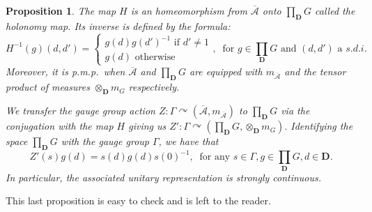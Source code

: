\documentclass[a4paper,12pt]{amsart}
\numberwithin{equation}{section}
\newtheorem{proposition}[theo]{Proposition}
\theoremstyle{definition}
\newcommand{\act}{\curvearrowright}
\newcommand{\oscrA}{{\overline{\mathscr{A}}}}
\newcommand{\D}{\mathbf D}
\newcommand{\Ga}{\Gamma}
\newcommand{\ot}{\otimes}\newcommand{\otmin}{\otimes_{\text{min}}}
\begin{document}
\begin{proposition}\label{prop:holonomy}
The map $H$ is an homeomorphism from $\oscrA$ onto $\prod_\D G$ called the holonomy map.
Its inverse is defined by the formula:
$$H^{-1}(g)(d,d') = \begin{cases} g(d) g(d')^{-1} \text{ if } d'\neq 1 \\ g(d) \text{ otherwise } \end{cases} , \ \text{ for } g\in\prod_\D G \text{ and } (d,d') \text{ a } s.d.i.$$
Moreover, it is p.m.p.~when $\oscrA$ and $\prod_\D G$ are equipped with $m_\oscrA$ and the tensor product of measures $\ot_\D m_G$ respectively.

We transfer the gauge group action $Z:\Ga\act (\oscrA,m_\oscrA)$ to $\prod_\D G$ via the conjugation with the map $H$ giving us $Z':\Ga\act (\prod_\D G, \ot_\D m_G).$
Identifying the space $\prod_\D G$ with the gauge group $\Ga$, we have that $$Z'(s)g(d) = s(d) g(d) s(0)^{-1},\ \text{ for any } s\in \Ga, g\in \prod_\D G, d\in \D.$$
In particular, the associated unitary representation is strongly continuous.
\end{proposition}

This last proposition is easy to check and is left to the reader.
\end{document}
